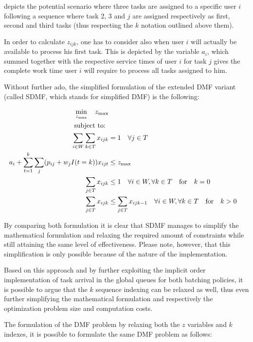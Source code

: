 \documentclass{seal_thesis}
\begin{document}
 depicts the potential scenario where three tasks are assigned to a specific user $i$ following a sequence where task 2, 3 and $j$ are assigned respectively as first, second and third tasks (thus respecting the $k$ notation outlined above them).

In order to calculate $z_{ijk}$, one has to consider also when user $i$ will actually be available to process his first task. This is depicted by the variable $a_i$, which summed together with the respective service times of user $i$ for task $j$ gives the complete work time user $i$ will require to process all tasks assigned to him.


Without further ado, the simplified formulation of the extended DMF variant (called SDMF, which stands for simplified DMF) is the following:

\begin{align}
    \min_{z_{\text{max}}} \quad z_{\text{max}}\\
    \text{subject to: } \notag \\
    \sum_{i \in W} \sum_{k \in T} x_{ijk} &= 1 \quad \forall j \in T\\
    a_i + \sum_{t=1}^k \sum_j (p_{ij} + w_j I(t=k))x_{ijt} &\leq z_{\text{max}}\\
    \sum_{j \in T} x_{ijk} &\leq 1 \quad \forall i \in W, \forall k \in T \quad \text{for} \quad k=0\\
    \sum_{j \in T} x_{ijk} &\leq \sum_{j \in T} x_{ijk-1} \quad \forall i \in W, \forall k \in T \quad \text{for} \quad k>0
\end{align}

By comparing both formulation it is clear that SDMF manages to simplify the mathematical formulation and relaxing the required amount of constraints while still attaining the same level of effectiveness. Please note, however, that this simplification is only possible because of the nature of the implementation.

Based on this approach and by further exploiting the implicit order implementation of task arrival in the global queues for both batching policies, it is possible to argue that the $k$ sequence indexing can be relaxed as well, thus even further simplifying the mathematical formulation and respectively the optimization problem size and computation costs.

The formulation of the DMF problem by relaxing both the $z$ variables and $k$ indexes, it is possible to formulate the same DMF problem as follows:
\end{document}
